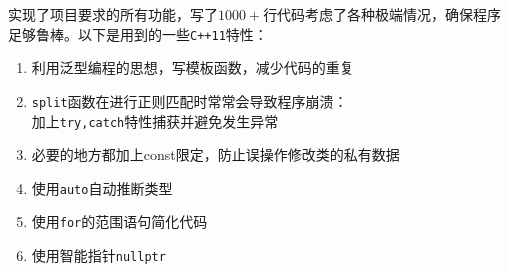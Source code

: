 \documentclass[11pt,UTF8]{ctexart}
\begin{document}
\par 实现了项目要求的所有功能，写了$1000+$行代码考虑了各种极端情况，确保程序足够鲁棒。以下是用到的一些\verb'C++11'特性：
\begin{enumerate}
	\item 利用泛型编程的思想，写模板函数，减少代码的重复
	\item \verb'split'函数在进行正则匹配时常常会导致程序崩溃：\\
		加上\verb'try,catch'特性捕获并避免发生异常
	\item 必要的地方都加上const限定，防止误操作修改类的私有数据
	\item 使用\verb'auto'自动推断类型
	\item 使用\verb'for'的范围语句简化代码
	\item 使用智能指针\verb'nullptr'
\end{enumerate}
\end{document}

